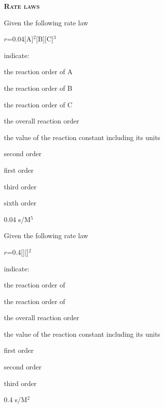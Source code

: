 \documentclass[main.tex]{subfiles}
\begin{document}
\begin{multicols*}{2}
{\raggedright\textsc{\textbf{Rate laws }}\par}

\begin{question}[ID=\the\value{numA}]
Given the following rate law
\begin{center}$r$=0.04[A]$^2$[B][C]$^3$\end{center}
indicate:
\begin{inparaenum}[(a)]
\item  the reaction order of A  %
\item  the reaction order of B  %
\item  the reaction order of C  %
\item  the overall reaction order%
\item  the value of the reaction constant including its units  %
\end{inparaenum}
\end{question}
\begin{solution}
\begin{inparaenum}[(a)]
\item   second order
\item   first order
\item   third order
\item   sixth order
\item   0.04 s/M$^5$
\end{inparaenum}\hspace{0.1cm}\end{solution}%


\begin{question}[ID=\the\value{numA}]
Given the following rate law
\begin{center}$r$=0.4[][]$^2$\end{center}
indicate:
\begin{inparaenum}[(a)]
\item  the reaction order of   %
\item  the reaction order of   %
\item  the overall reaction order%
\item  the value of the reaction constant including its units  %
\end{inparaenum}
\end{question}
\begin{solution}
\begin{inparaenum}[(a)]
\item   first order
\item   second order
\item   third order
\item   0.4 s/M$^2$
\end{inparaenum}\hspace{0.1cm}\end{solution}%




\end{multicols*}
\end{document}

